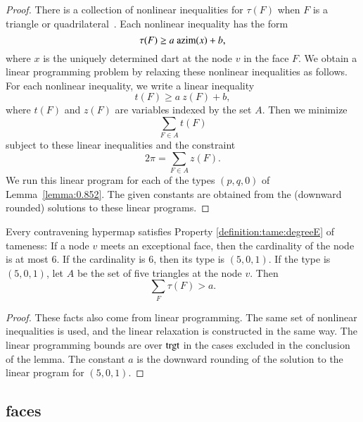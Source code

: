 \begin{proof} There is a collection of nonlinear inequalities
for $\tau(F)$ when $F$ is a triangle or quadrilateral~\cite[FUSDSPJ]{hales:2009:nonlinear}. Each nonlinear inequality has the form
$$\tau(F) \ge a~{\operatorname{azim}}(x) + b,$$
where $x$ is the uniquely determined dart at the node $v$ in the face $F$. We obtain a linear programming problem by relaxing these nonlinear inequalities as follows.  For each nonlinear inequality, we write a linear inequality
$$
t(F) \ge a~z(F) + b,
$$
where $t(F)$ and $z(F)$ are variables indexed by the set $A$.
Then we minimize 
$$\sum_{F\in A} t(F)$$
subject to these linear inequalities and the constraint
$$
2\pi = \sum_{F\in A} z(F).
$$
We run this linear program for each of the types $(p,q,0)$ of Lemma~\ref{lemma:0.852}. The given constants are obtained from the (downward rounded) solutions to these linear programs.
\end{proof}

\begin{lemma}\label{lemma:deg5}
Every contravening hypermap satisfies Property
\ref{definition:tame:degreeE} of tameness: If a node $v$ meets an
exceptional face, then the cardinality of the node is at most $6$.
If the cardinality is $6$, then its type is $(5,0,1)$.
If the type is $(5,0,1)$, let $A$ be the set of five triangles at the
node $v$.  Then
$$
\sum_F \tau(F) > a.
$$
\end{lemma}

\begin{proof} These facts also come from linear programming.
The same set of nonlinear inequalities is used, and the linear
relaxation is constructed in the same way.  The linear programming
bounds are over ${\operatorname{trgt}}$ in the cases excluded in the conclusion
of the lemma.  The constant $a$ is the downward rounding of the solution to the linear program for $(5,0,1)$.
\end{proof}

\subsection{faces}


